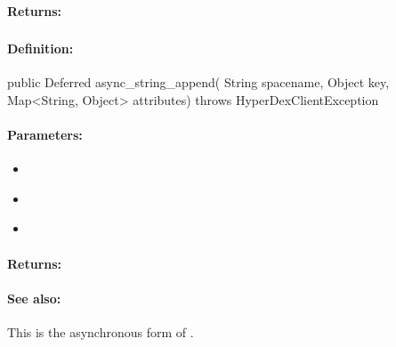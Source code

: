 \paragraph{Returns:}


\pagebreak
\subsubsection{}
\label{api:java:async_string_append}


\paragraph{Definition:}
\begin{javacode}
public Deferred async_string_append(
        String spacename,
        Object key,
        Map<String, Object> attributes) throws HyperDexClientException
\end{javacode}

\paragraph{Parameters:}
\begin{itemize}[noitemsep]
\item {}\\

\item {}\\

\item {}\\

\end{itemize}

\paragraph{Returns:}


\paragraph{See also:}  This is the asynchronous form of .

